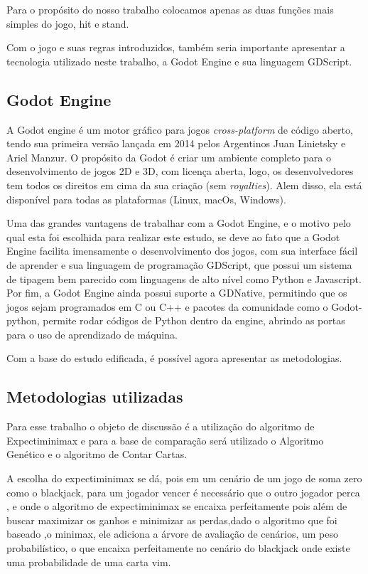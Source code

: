     Para o propósito do nosso trabalho colocamos apenas as duas funções 
    mais simples do jogo, hit e stand. 

    Com o jogo e suas regras introduzidos, também seria importante apresentar a 
    tecnologia utilizado neste trabalho, a Godot Engine e sua linguagem GDScript.

\subsection{Godot Engine}

    A Godot engine\cite{GodotEngine} é um motor gráfico para jogos \textit{cross-platform} de 
    código aberto, tendo sua primeira versão lançada em 2014 pelos Argentinos 
    Juan Linietsky e Ariel Manzur. O propósito da Godot é criar um ambiente 
    completo para o desenvolvimento de jogos 2D e 3D, com licença aberta, logo, 
    os desenvolvedores tem todos os direitos em cima da sua criação (sem \textit{royalties}). 
    Alem disso, ela está disponível para todas as plataformas (Linux, macOs, Windows).

    Uma das grandes vantagens de trabalhar com a Godot Engine, e o motivo pelo qual esta
    foi escolhida para realizar este estudo, se deve ao fato que a Godot Engine facilita imensamente 
    o desenvolvimento dos jogos, com sua interface fácil de aprender e sua linguagem de programação
    GDScript, que possui um sistema de tipagem bem parecido com linguagens de alto nível 
    como Python e Javascript. Por fim, a Godot Engine ainda possui suporte a GDNative, permitindo 
    que os jogos sejam programados em C ou C++ e pacotes da comunidade como o Godot-python\cite{GodotPython}, permite 
    rodar códigos de Python dentro da engine, abrindo as portas para o uso de aprendizado de máquina.

    Com a base do estudo edificada, é possível agora apresentar as metodologias.

\subsection{Metodologias utilizadas}

    Para esse trabalho o objeto de discussão é a utilização do algoritmo de Expectiminimax
    e para a base de comparação será utilizado o Algoritmo Genético e o algoritmo de Contar Cartas. 

    A escolha do expectiminimax se dá, pois em um cenário de um jogo de soma zero como o blackjack, 
    para um jogador vencer é necessário que o outro jogador perca , e onde o algoritmo de expectiminimax 
    se encaixa perfeitamente pois além de buscar maximizar os ganhos e minimizar as perdas,dado o algoritmo 
    que foi baseado ,o minimax, ele adiciona a árvore de avaliação de cenários, um peso probabilístico, o 
    que encaixa perfeitamente no cenário do blackjack onde existe uma probabilidade de uma carta vim. 

